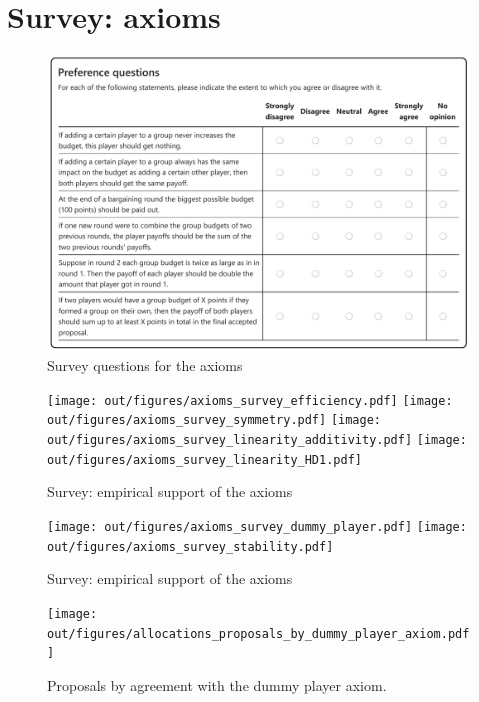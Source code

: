 \section{Survey: axioms}

\begin{figure}[!htb]
    \centering
    \includegraphics[width=.9\linewidth]{screenshots/survey_axioms.pdf}
    \caption{Survey questions for the axioms}
    \label{fig:survey_axioms_questions}
\end{figure}



\begin{figure}
    \centering
    \texttt{[image: out/figures/axioms\_survey\_efficiency.pdf]}
    \texttt{[image: out/figures/axioms\_survey\_symmetry.pdf]}
    \texttt{[image: out/figures/axioms\_survey\_linearity\_additivity.pdf]}
    \texttt{[image: out/figures/axioms\_survey\_linearity\_HD1.pdf]}
    \caption{Survey: empirical support of the axioms}
    \label{fig:axioms_survey_1}
\end{figure}

\begin{figure}
    \ContinuedFloat
    \centering
    \texttt{[image: out/figures/axioms\_survey\_dummy\_player.pdf]}
    \texttt{[image: out/figures/axioms\_survey\_stability.pdf]}
    \caption{Survey: empirical support of the axioms}
    \label{fig:axioms_survey_2}
\end{figure}


\begin{figure}
    \centering
    \texttt{[image: out/figures/allocations\_proposals\_by\_dummy\_player\_axiom.pdf]}
    \caption{Proposals by agreement with the dummy player axiom.}
    \label{fig:axioms_proposals_dummy_player}
\end{figure}

